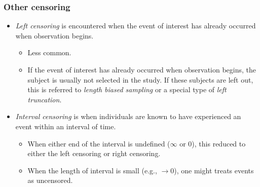 \documentclass[10pt]{beamer}\usepackage[]{graphicx}\usepackage[]{color}
\newcommand{\empr}[1]{{\emph{\color{red}#1}}}
\begin{document}
\begin{frame}
  \frametitle{Other censoring}
  \begin{itemize}
  \item \empr{Left censoring} is encountered when the event of interest has already occurred when observation begins.
    \begin{itemize}
    \item Less common. 
    \item If the event of interest has already occurred when observation begins, 
      the subject is usually not selected in the study. 
      If these subjects are left out, this is referred to \empr{length biased sampling} or a special type of \empr{left truncation}.
    \end{itemize}
  \item \empr{Interval censoring} is when individuals are known to have experienced an event within an interval of time.
    \begin{itemize}
    \item When either end of the interval is undefined ($\infty$ or 0), 
      this reduced to either the left censoring or right censoring.
    \item When the length of interval is small (e.g., $\to0$), one might treats events as uncensored.
    \end{itemize}
  \end{itemize}
\end{frame}  
\end{document}

